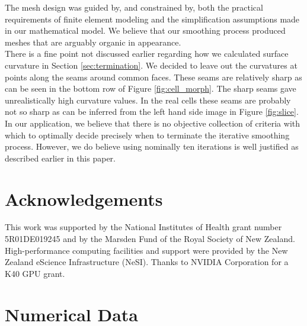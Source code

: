 \documentclass[a4paper,10pt]{article}
\begin{document}
The mesh design was guided by, and constrained by, both the practical requirements of finite element modeling and the simplification assumptions made in our mathematical model. We believe that our smoothing process produced meshes that are arguably organic in appearance.\\ 

There is a fine point not discussed earlier regarding how we calculated surface curvature in Section \ref{sec:termination}. We decided to leave out the curvatures at points along the seams around common faces. These seams are relatively sharp as can be seen in the bottom row of Figure \ref{fig:cell_morph}. The sharp seams gave unrealistically high curvature values. In the real cells these seams are probably not so sharp as can be inferred from the left hand side image in Figure \ref{fig:slice}.\\

In our application, we believe that there is no objective collection of criteria with which to optimally decide precisely when to terminate the iterative smoothing process. However, we do believe using nominally ten iterations is well justified as described earlier in this paper.\\

\section{Acknowledgements}
This work was supported by the National Institutes of Health grant number 5R01DE019245 and by the Marsden Fund of the Royal Society of New Zealand. High-performance computing facilities and support were provided by the New Zealand eScience Infrastructure (NeSI). Thanks to NVIDIA Corporation for a K40 GPU grant.\\




\pagebreak
\appendix

\section{Numerical Data}
\end{document}
